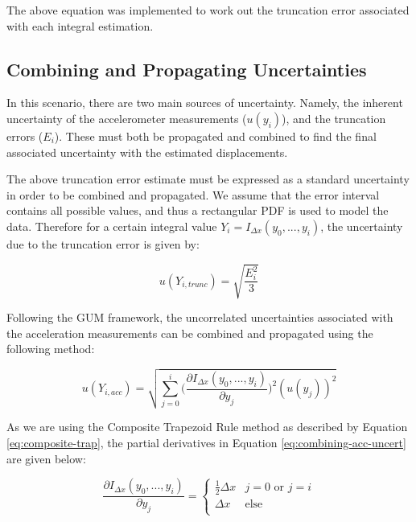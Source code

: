 \documentclass{article}
\begin{document}
        The above equation was implemented to work out the truncation error associated with each integral estimation.

    \subsection*{Combining and Propagating Uncertainties}

        In this scenario, there are two main sources of uncertainty. Namely, the inherent uncertainty of the accelerometer measurements ($u(y_i)$), and the truncation errors ($E_i$). These must both be propagated and combined to find the final associated uncertainty with the estimated displacements.
        
        The above truncation error estimate must be expressed as a standard uncertainty in order to be combined and propagated. We assume that the error interval contains all possible values, and thus a rectangular PDF is used to model the data. Therefore for a certain integral value $Y_i = I_{\Delta x}(y_0,...,y_i)$, the uncertainty due to the truncation error is given by:

        \begin{equation}
            u(Y_{i, trunc}) = \sqrt{\frac{E_i^2}{3}}
            \label{truncation-uncert}
        \end{equation}
    
        Following the GUM framework, the uncorrelated uncertainties associated with the acceleration measurements can be combined and propagated using the following method:

        \begin{equation}
            u(Y_{i, acc}) = \sqrt{ \sum^i_{j = 0} \Biggl( \frac{\partial I_{\Delta x}(y_0, ..., y_i)}{\partial y_j} \Biggr)^2 (u(y_j))^2 }
            \label{eq:combining-acc-uncert}
        \end{equation}

        As we are using the Composite Trapezoid Rule method as described by Equation \ref{eq:composite-trap}, the partial derivatives in Equation \ref{eq:combining-acc-uncert} are given below:

        \begin{equation}
            \frac{\partial I_{\Delta x}(y_0,...,y_i)}{\partial y_j} = \begin{cases}
                \frac{1}{2} \Delta x & j = 0 \text{ or } j = i \\
                \Delta x & \text{else} \\
            \end{cases}
            \label{eq:partial-int}
        \end{equation}
\end{document}
